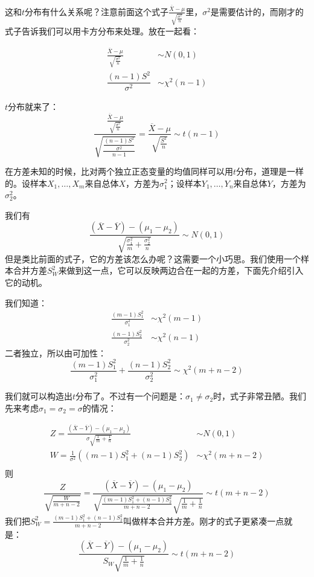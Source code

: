 这和$t$分布有什么关系呢？注意前面这个式子$\frac{\overline{X}-\mu}{\sqrt{\frac{\sigma^2}{n}}}$里，$\sigma^2$是需要估计的，而刚才的式子告诉我们可以用卡方分布来处理。放在一起看：

\begin{align*}
\frac{\overline{X}-\mu}{\sqrt{\frac{\sigma^2}{n}}} &\sim N(0,1)\quad \\
\dfrac{(n-1)S^2}{\sigma^2} &\sim \chi^2(n-1)
\end{align*}

$t$分布就来了：
\[
\frac{\frac{\overline{X}-\mu}{\sqrt{\frac{\sigma^2}{n}}}}{\sqrt{\frac{\dfrac{(n-1)S^2}{\sigma^2}}{n-1}}}=\frac{\overline{X}-\mu}{\sqrt{\frac{S^2}{n}}} \sim t(n-1)
\]

在方差未知的时候，比对两个独立正态变量的均值同样可以用$t$分布，道理是一样的。设样本$X_1,\ldots,X_m$来自总体$X$，方差为$\sigma_1^2$；设样本$Y_1,\ldots,Y_n$来自总体$Y$，方差为$\sigma_2^2$。

我们有
\[
\frac{(\overline{X}-\overline{Y})-(\mu_1-\mu_2)}{\sqrt{\frac{\sigma_1^2}{m}+\frac{\sigma_2^2}{n}}}\sim N(0,1)
\]
但是类比前面的式子，它的方差该怎么办呢？这需要一个小巧思。我们使用一个样本合并方差$S_W^2$来做到这一点，它可以反映两边合在一起的方差，下面先介绍引入它的动机。

我们知道：
\begin{align*}
\frac{(m-1)S_1^2}{\sigma_1^2}&\sim \chi^2(m-1)\\
\frac{(n-1)S_2^2}{\sigma_2^2}&\sim \chi^2(n-1)
\end{align*}
二者独立，所以由可加性：
\[
\frac{(m-1)S_1^2}{\sigma_1^2} + \frac{(n-1)S_2^2}{\sigma_2^2}\sim \chi^2(m+n-2)
\]

我们就可以构造出$t$分布了。不过有一个问题是：$\sigma_1 \neq \sigma_2$时，式子非常丑陋。我们先来考虑$\sigma_1=\sigma_2=\sigma$的情况：

\begin{align*}
Z=\frac{(\overline{X}-\overline{Y})-(\mu_1-\mu_2)}{\sigma\sqrt{\frac{1}{m}+\frac{1}{n}}}&\sim N(0,1)\\
W=\frac{1}{\sigma^2}\left((m-1)S_1^2 + (n-1)S_2^2\right)&\sim \chi^2(m+n-2)\\
\end{align*}
则
\[
\frac{Z}{\sqrt{\frac{W}{m+n-2}}} =\frac{(\overline{X}-\overline{Y})-(\mu_1-\mu_2)}{ \sqrt{\frac{(m-1)S_1^2 + (n-1)S_2^2}{m+n-2}}\sqrt{\frac{1}{m}+\frac{1}{n}}}\sim t(m+n-2)
\]
我们把$S_W^2=\frac{(m-1)S_1^2 + (n-1)S_2^2}{m+n-2}$叫做样本合并方差。刚才的式子更紧凑一点就是：
\[
\frac{(\overline{X}-\overline{Y})-(\mu_1-\mu_2)}{S_W\sqrt{\frac{1}{m}+\frac{1}{n}}}\sim t(m+n-2)
\]

